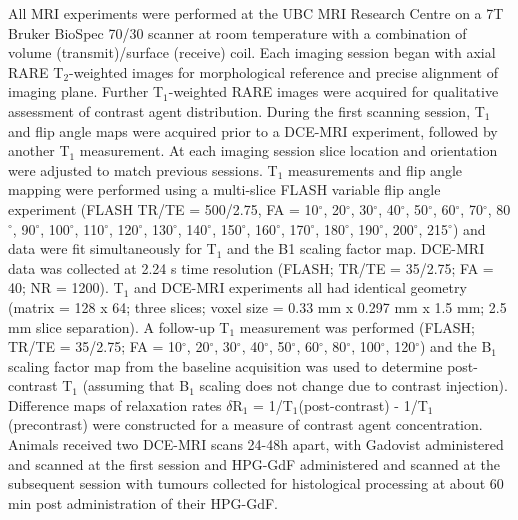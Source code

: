 All MRI experiments were performed at the UBC MRI Research Centre on a 7T Bruker BioSpec 70/30 scanner at room temperature with a combination of volume (transmit)/surface (receive) coil.
Each imaging session began with axial RARE T$_2$-weighted images for morphological reference and precise alignment of imaging plane.
Further T$_1$-weighted RARE images were acquired for qualitative assessment of contrast agent distribution.
During the first scanning session, T$_1$ and flip angle maps were acquired prior to a DCE-MRI experiment, followed by another T$_1$ measurement.
At each imaging session slice location and orientation were adjusted to match previous sessions.
T$_1$ measurements and flip angle mapping were performed using a multi-slice FLASH variable flip angle experiment (FLASH TR/TE = 500/2.75, FA = 10$^{\circ}$, 20$^{\circ}$, 30$^{\circ}$, 40$^{\circ}$, 50$^{\circ}$, 60$^{\circ}$, 70$^{\circ}$, 80$^{\circ}$, 90$^{\circ}$, 100$^{\circ}$, 110$^{\circ}$, 120$^{\circ}$, 130$^{\circ}$, 140$^{\circ}$, 150$^{\circ}$, 160$^{\circ}$, 170$^{\circ}$, 180$^{\circ}$, 190$^{\circ}$, 200$^{\circ}$, 215$^{\circ}$) and data were fit simultaneously for T$_1$ and the B1 scaling factor map.
DCE-MRI data was collected at 2.24 s time resolution (FLASH; TR/TE = 35/2.75; FA = 40; NR = 1200).
T$_1$ and DCE-MRI experiments all had identical geometry (matrix = 128 x 64; three slices; voxel size = 0.33 mm x 0.297 mm x 1.5 mm; 2.5 mm slice separation).
A follow-up T$_1$ measurement was performed (FLASH; TR/TE = 35/2.75; FA = 10$^{\circ}$, 20$^{\circ}$, 30$^{\circ}$, 40$^{\circ}$, 50$^{\circ}$, 60$^{\circ}$, 80$^{\circ}$, 100$^{\circ}$, 120$^{\circ}$) and the B$_1$ scaling factor map from the baseline acquisition was used to determine post-contrast T$_1$ (assuming that B$_1$ scaling does not change due to contrast injection).
Difference maps of relaxation rates $\delta$R$_1$ = 1/T$_1$(post-contrast) - 1/T$_1$(precontrast) were constructed for a measure of contrast agent concentration.
Animals received two DCE-MRI scans 24-48h apart, with Gadovist administered and scanned at the first session and \ac{HPG-GdF} administered and scanned at the subsequent session with tumours collected for histological processing at about 60 min post administration of their \ac{HPG-GdF}.

